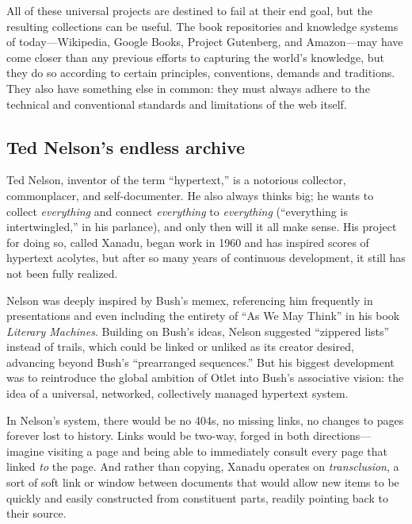 All of these universal projects are destined to fail at their end goal, but the resulting collections can be useful. The book repositories and knowledge systems of today---Wikipedia, Google Books, Project Gutenberg, and Amazon---may have come closer than any previous efforts to capturing the world's knowledge, but they do so according to certain principles, conventions, demands and traditions. They also have something else in common: they must always adhere to the technical and conventional standards and limitations of the web itself. 

\subsection{Ted Nelson's endless archive}

Ted Nelson, inventor of the term ``hypertext,'' is a notorious collector, commonplacer, and self-documenter. He also always thinks big; he wants to collect \emph{everything} and connect \emph{everything} to \emph{everything} (``everything is intertwingled,'' in his parlance), and only then will it all make sense. His project for doing so, called Xanadu, began work in 1960 and has inspired scores of hypertext acolytes, but after so many years of continuous development, it still has not been fully realized.

Nelson was deeply inspired by Bush's memex, referencing him frequently in presentations and even including the entirety of ``As We May Think'' in his book \emph{Literary Machines}. Building on Bush's ideas, Nelson suggested ``zippered lists'' instead of trails, which could be linked or unliked as its creator desired, advancing beyond Bush's ``prearranged sequences.''\autocite[313]{nelson_computer_1974} But his biggest development was to reintroduce the global ambition of Otlet into Bush's associative vision: the idea of a universal, networked, collectively managed hypertext system.

In Nelson's system, there would be no 404s, no missing links, no changes to pages forever lost to history. Links would be two-way, forged in both directions---imagine visiting a page and being able to immediately consult every page that linked \emph{to} the page. And rather than copying, Xanadu operates on \emph{transclusion}, a sort of soft link or window between documents that would allow new items to be quickly and easily constructed from constituent parts, readily pointing back to their source.

